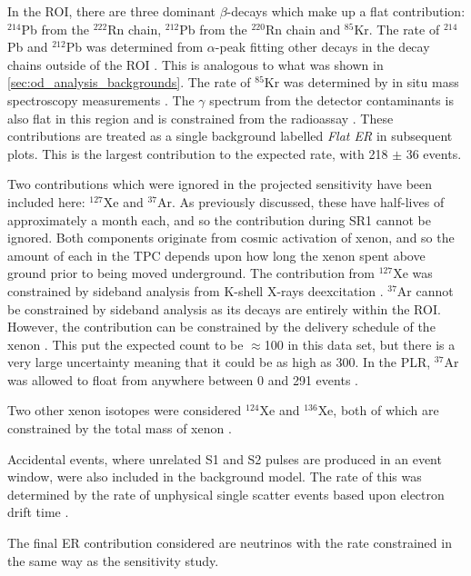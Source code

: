 \par
In the ROI, there are three dominant $\beta$-decays which make up a flat contribution: ${}^{214}$Pb from the ${}^{222}$Rn chain, ${}^{212}$Pb from the ${}^{220}$Rn chain and ${}^{85}$Kr.
The rate of ${}^{214}$Pb and ${}^{212}$Pb was determined from $\alpha$-peak fitting other decays in the decay chains outside of the ROI \cite{lz_sr1_backgrounds_ref}.
This is analogous to what was shown in \autoref{sec:od_analysis_backgrounds}.
The rate of ${}^{85}$Kr was determined by in situ mass spectroscopy measurements \cite{lz_sr1_backgrounds_ref}. 
The $\gamma$ spectrum from the detector contaminants is also flat in this region and is constrained from the radioassay \cite{LZ_assay_ref}.
These contributions are treated as a single background labelled \textit{Flat ER} in subsequent plots.
This is the largest contribution to the expected rate, with 218 $\pm$ 36 events.
\par
Two contributions which were ignored in the projected sensitivity have been included here: ${}^{127}$Xe and ${}^{37}$Ar.
As previously discussed, these have half-lives of approximately a month each, and so the contribution during SR1 cannot be ignored.
Both components originate from cosmic activation of xenon, and so the amount of each in the TPC depends upon how long the xenon spent above ground prior to being moved underground.
The contribution from $^{127}$Xe was constrained by sideband analysis from K-shell X-rays deexcitation \cite{marisarthurs_thesis_ref}.
${}^{37}$Ar cannot be constrained by sideband analysis as its decays are entirely within the ROI.
However, the contribution can be constrained by the delivery schedule of the xenon \cite{lz_argon37_ref}.
This put the expected count to be $\approx$100 in this data set, but there is a very large uncertainty meaning that it could be as high as 300.
In the PLR, ${}^{37}$Ar was allowed to float from anywhere between 0 and 291 events \cite{lz_argon37_ref}.
\par
Two other xenon isotopes were considered ${}^{124}$Xe and ${}^{136}$Xe, both of which are constrained by the total mass of xenon \cite{lz_ws_sr1_ref}.
\par
Accidental events, where unrelated S1 and S2 pulses are produced in an event window, were also included in the background model.
The rate of this was determined by the rate of unphysical single scatter events based upon electron drift time \cite{lz_ws_sr1_ref}.
\par
The final ER contribution considered are neutrinos with the rate constrained in the same way as the sensitivity study.
